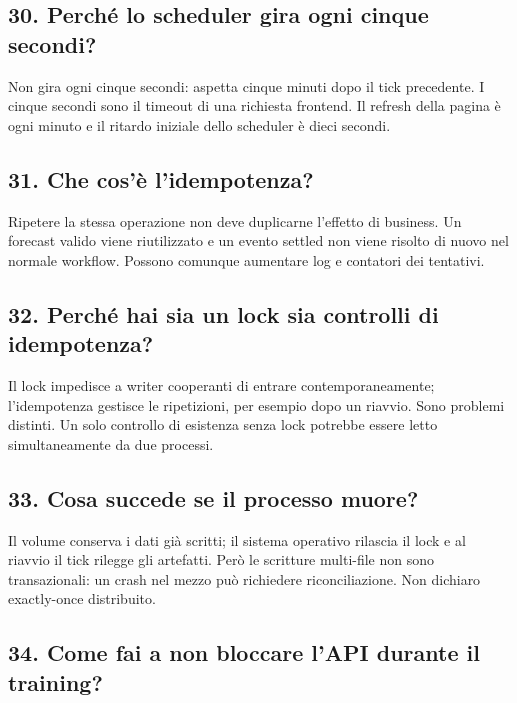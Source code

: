 \documentclass[11pt,a4paper]{article}
\begin{document}
\subsection{30. Perché lo scheduler gira ogni cinque secondi?}\label{perchuxe9-lo-scheduler-gira-ogni-cinque-secondi}

Non gira ogni cinque secondi: aspetta cinque minuti dopo il tick precedente. I cinque secondi sono il timeout di una richiesta frontend. Il refresh della pagina è ogni minuto e il ritardo iniziale dello scheduler è dieci secondi.

\subsection{31. Che cos'è l'idempotenza?}\label{che-cosuxe8-lidempotenza}

Ripetere la stessa operazione non deve duplicarne l'effetto di business. Un forecast valido viene riutilizzato e un evento settled non viene risolto di nuovo nel normale workflow. Possono comunque aumentare log e contatori dei tentativi.

\subsection{32. Perché hai sia un lock sia controlli di idempotenza?}\label{perchuxe9-hai-sia-un-lock-sia-controlli-di-idempotenza}

Il lock impedisce a writer cooperanti di entrare contemporaneamente; l'idempotenza gestisce le ripetizioni, per esempio dopo un riavvio. Sono problemi distinti. Un solo controllo di esistenza senza lock potrebbe essere letto simultaneamente da due processi.

\subsection{33. Cosa succede se il processo muore?}\label{cosa-succede-se-il-processo-muore}

Il volume conserva i dati già scritti; il sistema operativo rilascia il lock e al riavvio il tick rilegge gli artefatti. Però le scritture multi-file non sono transazionali: un crash nel mezzo può richiedere riconciliazione. Non dichiaro exactly-once distribuito.

\subsection{34. Come fai a non bloccare l'API durante il training?}\label{come-fai-a-non-bloccare-lapi-durante-il-training}
\end{document}
